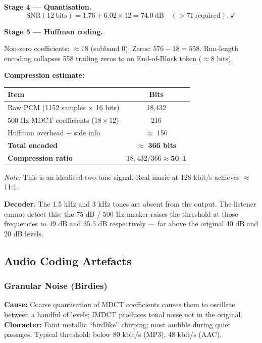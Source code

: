 \begin{examplebox}
\medskip
\noindent\textbf{Stage 4 --- Quantisation.}
\[
\mathrm{SNR}(12\ \text{bits}) = 1.76 + 6.02\times12 = 74.0\ \text{dB} \quad (> 71\ \text{required}).\ \checkmark
\]

\medskip
\noindent\textbf{Stage 5 --- Huffman coding.}

Non-zero coefficients: $\approx 18$ (subband 0). Zeros: $576 - 18 = 558$.
Run-length encoding collapses 558 trailing zeros to an End-of-Block token ($\approx$8 bits).

\medskip
\noindent\textbf{Compression estimate:}
\begin{center}
\begin{tabular}{lc}
\toprule
Item & Bits \\
\midrule
Raw PCM (1152 samples $\times$ 16 bits) & 18,432 \\
500 Hz MDCT coefficients ($18 \times 12$) & 216 \\
Huffman overhead + side info & $\approx$ 150 \\
\textbf{Total encoded} & $\approx$ \textbf{366 bits} \\
\textbf{Compression ratio} & $18{,}432/366 \approx \mathbf{50:1}$ \\
\bottomrule
\end{tabular}
\end{center}

\textit{Note:} This is an idealised two-tone signal. Real music at 128 kbit/s achieves $\approx$11:1.

\medskip
\noindent\textbf{Decoder.} The 1.5 kHz and 3 kHz tones are absent from the output. The listener cannot detect this: the 75 dB / 500 Hz masker raises the threshold at those frequencies to 49 dB and 35.5 dB respectively --- far above the original 40 dB and 20 dB levels.
\end{examplebox}

\subsection{Audio Coding Artefacts}

\subsubsection{Granular Noise (Birdies)}
\textbf{Cause:} Coarse quantisation of MDCT coefficients causes them to oscillate between a handful of levels; IMDCT produces tonal noise not in the original.\\
\textbf{Character:} Faint metallic ``birdlike'' chirping; most audible during quiet passages. Typical threshold: below 80 kbit/s (MP3), 48 kbit/s (AAC).

